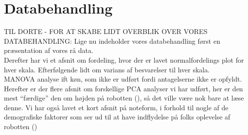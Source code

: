 \chapter{Databehandling}
\label{TestAfSkalaDatabehandling}
%
TIL DORTE - FOR AT SKABE LIDT OVERBLIK OVER VORES DATABEHANDLING: \blankline
%
Lige nu indeholder vores databehandling først en præsentation af vores rå data. \\
Derefter har vi et afsnit om fordeling, hvor der er lavet normalfordelings plot for hver skala. Efterfølgende lidt om varians af besvarelser til hver skala. \\
MANOVA analyse ift køn, som ikke er udført fordi antagelserne ikke er opfyldt.\\
Herefter er der flere afsnit om forskellige PCA analyser vi har udført, her er den mest ``færdige'' den om højden på robotten (), så det ville være nok bare at læse denne. 
Vi har også lavet et kort afsnit på noteform, i forhold til nogle af de demografiske faktorer som ser ud til at have indflydelse på folks oplevelse af robotten ()